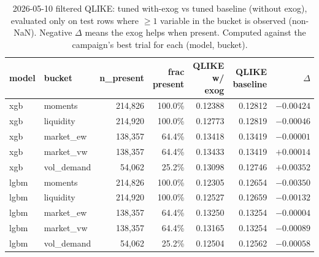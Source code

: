 \documentclass{article}
\begin{document}
\begin{table}[t]
\centering
\caption{2026-05-10 filtered QLIKE: tuned with-exog vs tuned baseline (without exog), evaluated only on test rows where $\geq 1$ variable in the bucket is observed (non-NaN). Negative $\Delta$ means the exog helps when present. Computed against the campaign's best trial for each (model, bucket).}
\label{tab:filtered_qlike}
\begin{tabular}{llrrrrr}
\toprule
model & bucket & n\_present & frac present & QLIKE w/ exog & QLIKE baseline & $\Delta$ \\
\midrule
xgb  & moments    & 214{,}826 & 100.0\% & 0.12388 & 0.12812 & $-0.00424$ \\
xgb  & liquidity  & 214{,}920 & 100.0\% & 0.12773 & 0.12819 & $-0.00046$ \\
xgb  & market\_ew & 138{,}357 & ~64.4\% & 0.13418 & 0.13419 & $-0.00001$ \\
xgb  & market\_vw & 138{,}357 & ~64.4\% & 0.13433 & 0.13419 & $+0.00014$ \\
xgb  & vol\_demand & ~54{,}062 & ~25.2\% & 0.13098 & 0.12746 & $+0.00352$ \\
\midrule
lgbm & moments    & 214{,}826 & 100.0\% & 0.12305 & 0.12654 & $-0.00350$ \\
lgbm & liquidity  & 214{,}920 & 100.0\% & 0.12527 & 0.12659 & $-0.00132$ \\
lgbm & market\_ew & 138{,}357 & ~64.4\% & 0.13250 & 0.13254 & $-0.00004$ \\
lgbm & market\_vw & 138{,}357 & ~64.4\% & 0.13165 & 0.13254 & $-0.00089$ \\
lgbm & vol\_demand & ~54{,}062 & ~25.2\% & 0.12504 & 0.12562 & $-0.00058$ \\
\bottomrule
\end{tabular}
\end{table}
\end{document}
